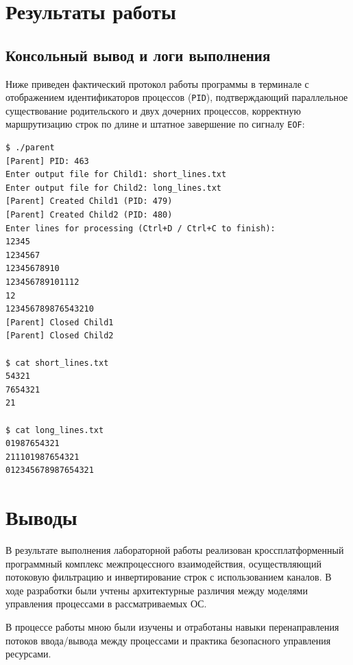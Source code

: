 \documentclass[11pt, a4paper]{article}
\begin{document}
\section{Результаты работы}

\subsection{Консольный вывод и логи выполнения}
Ниже приведен фактический протокол работы программы в терминале с отображением идентификаторов процессов (\texttt{PID}), подтверждающий параллельное существование родительского и двух дочерних процессов, корректную маршрутизацию строк по длине и штатное завершение по сигналу \texttt{EOF}:

\begin{lstlisting}
$ ./parent
[Parent] PID: 463
Enter output file for Child1: short_lines.txt
Enter output file for Child2: long_lines.txt
[Parent] Created Child1 (PID: 479)
[Parent] Created Child2 (PID: 480)
Enter lines for processing (Ctrl+D / Ctrl+C to finish): 
12345 
1234567
12345678910
123456789101112
12
123456789876543210
[Parent] Closed Child1
[Parent] Closed Child2

$ cat short_lines.txt 
54321
7654321
21

$ cat long_lines.txt 
01987654321
211101987654321
012345678987654321
\end{lstlisting}

\section{Выводы}
В результате выполнения лабораторной работы реализован кроссплатформенный программный комплекс межпроцессного взаимодействия, осуществляющий потоковую фильтрацию и инвертирование строк с использованием каналов. В ходе разработки были учтены архитектурные различия между моделями управления процессами в рассматриваемых ОС. 

В процессе работы мною были изучены и отработаны навыки перенаправления потоков ввода/вывода между процессами и практика безопасного управления ресурсами.
\end{document}
